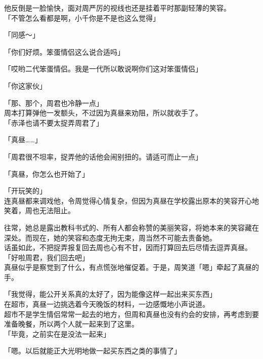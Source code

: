 他反倒是一脸愉快，面对周严厉的视线也还是挂着平时那副轻薄的笑容。\\

「不管怎么看都是啊，小千你是不是也这么觉得」

「同感～」

「你们好烦。笨蛋情侣这么说合适吗」

「哎哟二代笨蛋情侣。我是一代所以敢说啊你们这对笨蛋情侣」

「你这家伙」

「那、那个，周君也冷静一点」\\

周本打算弹他一发额头，不过因为真昼来劝阻，所以就收手了。\\

「赤泽也请不要太捉弄周君了」

「真昼……」

「周君很不坦率，捉弄他的话他会闹别扭的。请适可而止一点」

「真昼，你怎么也开始了」

「开玩笑的」\\

连真昼都来调戏他，令周觉得心情复杂，但因为真昼在学校露出原本的笑容开心地笑着，周也无法阻止。

往常，她总是露出教科书式的、所有人都会称赞的美丽笑容，将她本来的笑容藏在深处。而现在，她的笑容和态度无拘无束，周当然不可能去责备她。\\

话虽如此，不把捉弄报复回去周也心有不甘，因而打算回去后尽情去逗弄真昼。\\

「好啦周君，我们回去吧」\\

真昼似乎是察觉到了什么，有点慌张地催促着。于是，周笑道「嗯」牵起了真昼的手。\\

\vspace{2\baselineskip}

「我觉得，能公开关系真的太好了，因为能像这样一起出来买东西」\\

在超市，真昼一边挑选着今天晚饭的材料，一边感慨地小声说道。\\

超市不是学生情侣常常一起去的地方，但周和真昼也没有约会的安排，再考虑到要准备晚餐，所以两个人就一起来到了这里。\\

「毕竟，之前实在是没法一起来」

「嗯。以后就能正大光明地做一起买东西之类的事情了」

